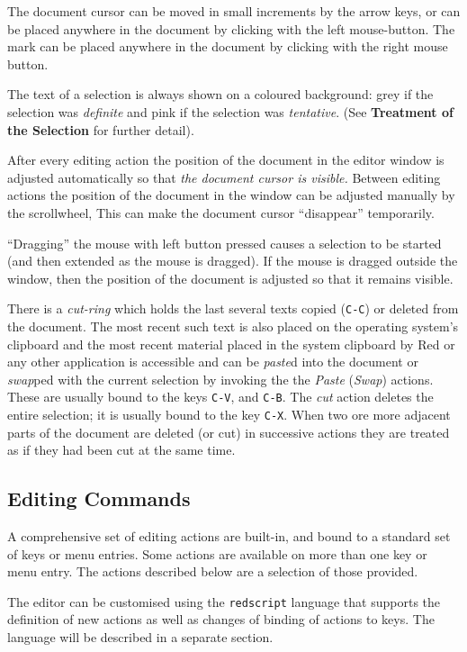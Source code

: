 \documentclass[
]{article}
\begin{document}
The document cursor can be moved in small increments by the arrow keys,
or can be placed anywhere in the document by clicking with the left
mouse-button. The mark can be placed anywhere in the document by
clicking with the right mouse button.

The text of a selection is always shown on a coloured background: grey
if the selection was \emph{definite} and pink if the selection was
\emph{tentative}. (See \textbf{Treatment of the Selection} for further
detail).

After every editing action the position of the document in the editor
window is adjusted automatically so that \emph{the document cursor is
visible.} Between editing actions the position of the document in the
window can be adjusted manually by the scrollwheel, This can make the
document cursor ``disappear'' temporarily.

``Dragging'' the mouse with left button pressed causes a selection to be
started (and then extended as the mouse is dragged). If the mouse is
dragged outside the window, then the position of the document is
adjusted so that it remains visible.

There is a \emph{cut-ring} which holds the last several texts copied
(\texttt{C-C}) or deleted from the document. The most recent such text
is also placed on the operating system's clipboard and the most recent
material placed in the system clipboard by Red or any other application
is accessible and can be \emph{paste}d into the document or
\emph{swap}ped with the current selection by invoking the the
\emph{Paste} (\emph{Swap}) actions. These are usually bound to the keys
\texttt{C-V}, and \texttt{C-B}. The \emph{cut} action deletes the entire
selection; it is usually bound to the key \texttt{C-X}. When two ore
more adjacent parts of the document are deleted (or cut) in successive
actions they are treated as if they had been cut at the same time.

\hypertarget{editing-commands}{%
\subsection{Editing Commands}\label{editing-commands}}

A comprehensive set of editing actions are built-in, and bound to a
standard set of keys or menu entries. Some actions are available on more
than one key or menu entry. The actions described below are a selection
of those provided.

The editor can be customised using the \texttt{redscript} language that
supports the definition of new actions as well as changes of binding of
actions to keys. The language will be described in a separate section.
\end{document}
